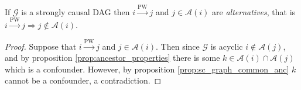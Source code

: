 \documentclass[12pt]{article}
\def\pwgc{\overset{\text{PW}}{\rightarrow}}  %
\def\gcg{\mathcal{G}}  %
\newcommand{\anc}[1]{\mathcal{A}(#1)}  %
\newcommand{\gcgpath}[2]{#1 \rightarrow \cdots \rightarrow #2}  %
\begin{document}
  
\begin{corollary}
  \label{cor:parent_corollary}
  If $\gcg$ is a strongly causal DAG then $i \pwgc j$ and $j \in \anc{i}$ are
  \textit{alternatives}, that is $i \pwgc j \Rightarrow j \notin \anc{i}$.
\end{corollary}
\begin{proof}
  Suppose that $i \pwgc j$ and $j \in \anc{i}$.  Then since $\gcg$ is
  acyclic $i \not\in \anc{j}$, and by proposition
  \ref{prop:ancestor_properties} there is some
  $k \in \anc{i}\cap\anc{j}$ which is a confounder.  However, by
  proposition \ref{prop:sc_graph_common_anc} $k$ cannot be a
  confounder, a contradiction.
\end{proof}



  
\end{document}
